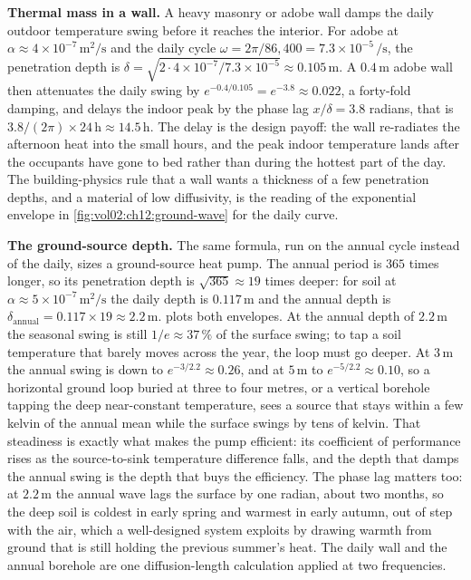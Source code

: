 \textbf{Thermal mass in a wall.} A heavy masonry or adobe wall damps
the daily outdoor temperature swing before it reaches the interior. For
adobe at $\alpha \approx 4\times 10^{-7}\,\si{\meter\squared\per
\second}$ and the daily cycle $\omega = 2\pi/86{,}400 = 7.3\times
10^{-5}\,\si{\per\second}$, the penetration depth is $\delta =
\sqrt{2\cdot 4\times 10^{-7}/7.3\times 10^{-5}} \approx 0.105\,\si{
\meter}$. A $0.4\,\si{\meter}$ adobe wall then attenuates the daily
swing by $e^{-0.4/0.105} = e^{-3.8} \approx 0.022$, a forty-fold
damping, and delays the indoor peak by the phase lag $x/\delta = 3.8$
radians, that is $3.8/(2\pi)\times 24\,\si{\hour} \approx 14.5\,\si{
\hour}$. The delay is the design payoff: the wall re-radiates the
afternoon heat into the small hours, and the peak indoor temperature
lands after the occupants have gone to bed rather than during the
hottest part of the day. The building-physics rule that a wall wants a
thickness of a few penetration depths, and a material of low
diffusivity, is the reading of the exponential envelope in
\cref{fig:vol02:ch12:ground-wave} for the daily curve.

\textbf{The ground-source depth.} The same formula, run on the annual
cycle instead of the daily, sizes a ground-source heat pump. The
annual period is $365$ times longer, so its penetration depth is
$\sqrt{365} \approx 19$ times deeper: for soil at $\alpha \approx
5\times 10^{-7}\,\si{\meter\squared\per\second}$ the daily depth is
$0.117\,\si{\meter}$ and the annual depth is $\delta_{\text{annual}} =
0.117\times 19 \approx 2.2\,\si{\meter}$. 
plots both envelopes. At the annual depth of $2.2\,\si{\meter}$ the
seasonal swing is still $1/e \approx 37\,\%$ of the surface swing; to
tap a soil temperature that barely moves across the year, the loop must
go deeper. At $3\,\si{\meter}$ the annual swing is down to
$e^{-3/2.2} \approx 0.26$, and at $5\,\si{\meter}$ to $e^{-5/2.2}
\approx 0.10$, so a horizontal ground loop buried at three to four
metres, or a vertical borehole tapping the deep near-constant
temperature, sees a source that stays within a few kelvin of the
annual mean while the surface swings by tens of kelvin. That
steadiness is exactly what makes the pump efficient: its coefficient
of performance rises as the source-to-sink temperature difference
falls, and the depth that damps the annual swing is the depth that
buys the efficiency. The phase lag matters too: at $2.2\,\si{\meter}$
the annual wave lags the surface by one radian, about two months, so
the deep soil is coldest in early spring and warmest in early autumn,
out of step with the air, which a well-designed system exploits by
drawing warmth from ground that is still holding the previous summer's
heat. The daily wall and the annual borehole are one diffusion-length
calculation applied at two frequencies.

